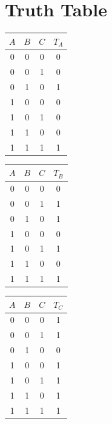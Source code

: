 \documentclass{article}
\begin{document}
\section*{Truth Table}
\begin{table}[H]
  \begin{tabular}{ccc|c}
    \toprule
    $A$&$B$&$C$&$T_A$\\
    \midrule
    0&0&0 & 0\\
    0&0&1 & 0\\
    0&1&0 & 1\\
    1&0&0 & 0\\
    1&0&1 & 0\\
    1&1&0 & 0\\
    1&1&1 & 1\\
    \bottomrule
  \end{tabular}
  \quad
  \begin{tabular}{ccc|c}
    \toprule
    $A$&$B$&$C$&$T_B$\\
    \midrule
    0&0&0 & 0\\
    0&0&1 & 1\\
    0&1&0 & 1\\
    1&0&0 & 0\\
    1&0&1 & 1\\
    1&1&0 & 0\\
    1&1&1 & 1\\
    \bottomrule
  \end{tabular}
  \quad
  \begin{tabular}{ccc|c}
    \toprule
    $A$&$B$&$C$&$T_C$\\
    \midrule
    0&0&0 & 1\\
    0&0&1 & 1\\
    0&1&0 & 0\\
    1&0&0 & 1\\
    1&0&1 & 1\\
    1&1&0 & 1\\
    1&1&1 & 1\\
    \bottomrule
  \end{tabular}
\end{table}
\newpage
\end{document}
